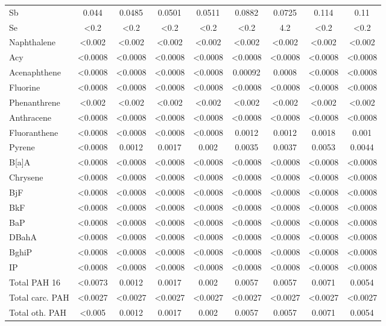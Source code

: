 \documentclass[algorithms,article,submit,pdftex,moreauthors]{Definitions/mdpi}
\begin{document}
\begin{scriptsize}
\begin{center}
\begin{longtable}{@{\extracolsep{\fill}}|p{1.8cm}|cccccccc|@{}}
Sb & 0.044 & 0.0485 & 0.0501 & 0.0511 & 0.0882 & 0.0725 & 0.114 & 0.11 \\
Se & <0.2 & <0.2 & <0.2 & <0.2 & <0.2 & 4.2 & <0.2 & <0.2 \\
Naphthalene & <0.002 & <0.002 & <0.002 & <0.002 & <0.002 & <0.002 & <0.002 & <0.002 \\
Acy & <0.0008 & <0.0008 & <0.0008 & <0.0008 & <0.0008 & <0.0008 & <0.0008 & <0.0008  \\
Acenaphthene & <0.0008 & <0.0008 & <0.0008 & <0.0008 & 0.00092 & 0.0008 & <0.0008 & <0.0008 \\
Fluorine & <0.0008 & <0.0008 & <0.0008 & <0.0008 & <0.0008 & <0.0008 & <0.0008 & <0.0008 \\
Phenanthrene & <0.002 & <0.002 & <0.002 & <0.002 & <0.002 & <0.002 & <0.002 & <0.002 \\
Anthracene & <0.0008 & <0.0008 & <0.0008 & <0.0008 & <0.0008 & <0.0008 & <0.0008 & <0.0008 \\
Fluoranthene & <0.0008 & <0.0008 & <0.0008 & <0.0008 & 0.0012 & 0.0012 & 0.0018 & 0.001 \\
Pyrene & <0.0008 & 0.0012 & 0.0017 & 0.002 & 0.0035 & 0.0037 & 0.0053 & 0.0044 \\
B[a]A & <0.0008 & <0.0008 & <0.0008 & <0.0008 & <0.0008 & <0.0008 & <0.0008 & <0.0008  \\
Chrysene & <0.0008 & <0.0008 & <0.0008 & <0.0008 & <0.0008 & <0.0008 & <0.0008 & <0.0008  \\
BjF & <0.0008 & <0.0008 & <0.0008 & <0.0008 & <0.0008 & <0.0008 & <0.0008 & <0.0008  \\
BkF & <0.0008 & <0.0008 & <0.0008 & <0.0008 & <0.0008 & <0.0008 & <0.0008 & <0.0008  \\
BaP & <0.0008 & <0.0008 & <0.0008 & <0.0008 & <0.0008 & <0.0008 & <0.0008 & <0.0008  \\
DBahA & <0.0008 & <0.0008 & <0.0008 & <0.0008 & <0.0008 & <0.0008 & <0.0008 & <0.0008  \\
BghiP & <0.0008 & <0.0008 & <0.0008 & <0.0008 & <0.0008 & <0.0008 & <0.0008 & <0.0008  \\
IP & <0.0008 & <0.0008 & <0.0008 & <0.0008 & <0.0008 & <0.0008 & <0.0008 & <0.0008  \\
Total PAH 16 & <0.0073 & 0.0012 & 0.0017 & 0.002 & 0.0057 & 0.0057 & 0.0071 & 0.0054  \\
Total carc. PAH & <0.0027 &  <0.0027 &  <0.0027 &  <0.0027 &  <0.0027 &  <0.0027 &  <0.0027 &  <0.0027 \\
Total oth. PAH & <0.005 & 0.0012 & 0.0017 & 0.002 & 0.0057 & 0.0057 & 0.0071 & 0.0054 \\

\end{longtable}
\end{center}
\end{scriptsize}
\end{document}
